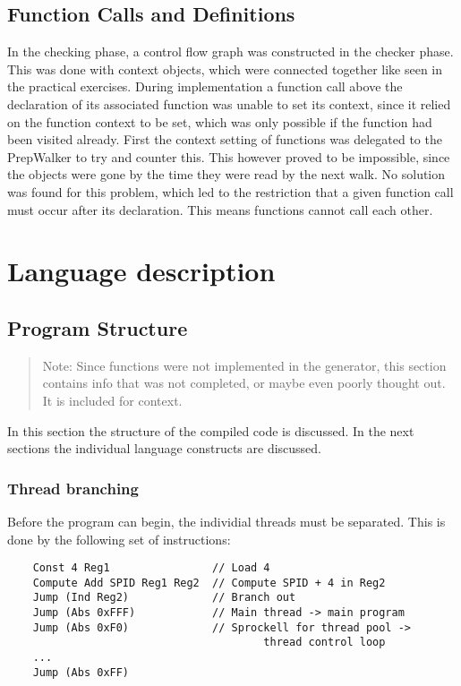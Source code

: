 \documentclass[10pt,a4paper]{report}
\begin{document}
\section{Function Calls and Definitions}
In the checking phase, a control flow graph was constructed in the checker phase. This was done with context objects, which were connected together like seen in the practical exercises. During implementation a function call above the declaration of its associated function was unable to set its context, since it relied on the function context to be set, which was only possible if the function had been visited already. First the context setting of functions was delegated to the PrepWalker to try and counter this. This however proved to be impossible, since the objects were gone by the time they were read by the next walk. No solution was found for this problem, which led to the restriction that a given function call must occur after its declaration. This means functions cannot call each other.


\chapter{Language description} \label{chp:langdesc}

\section{Program Structure} \label{sec:structure}

\begin{quote}
	Note: Since functions were not implemented in the generator, this section contains info that was not completed, or maybe even poorly thought out. It is included for context. 
\end{quote}

In this section the structure of the compiled code is discussed. In the next sections the individual language constructs are discussed. 
\subsection{Thread branching}
Before the program can begin, the individial threads must be separated. This is done by the following set of instructions:
\begin{lstlisting}
	Const 4 Reg1				// Load 4
	Compute Add SPID Reg1 Reg2	// Compute SPID + 4 in Reg2
	Jump (Ind Reg2)				// Branch out
	Jump (Abs 0xFFF)			// Main thread -> main program
	Jump (Abs 0xF0)				// Sprockell for thread pool -> 
										thread control loop
	...
	Jump (Abs 0xFF)
\end{lstlisting}
\end{document}
